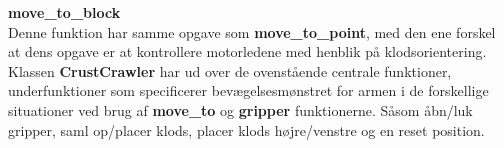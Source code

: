 \textbf{move\_to\_block}\\
Denne funktion har samme opgave som \textbf{move\_to\_point}, med den ene forskel at dens opgave er at kontrollere motorledene med henblik på klodsorientering.\\

Klassen \textbf{CrustCrawler} har ud over de ovenstående centrale funktioner, underfunktioner som specificerer bevægelsesmønstret for armen i de forskellige situationer ved brug af \textbf{move\_to} og \textbf{gripper} funktionerne. Såsom åbn/luk gripper, saml op/placer klods, placer klods højre/venstre og en reset position.